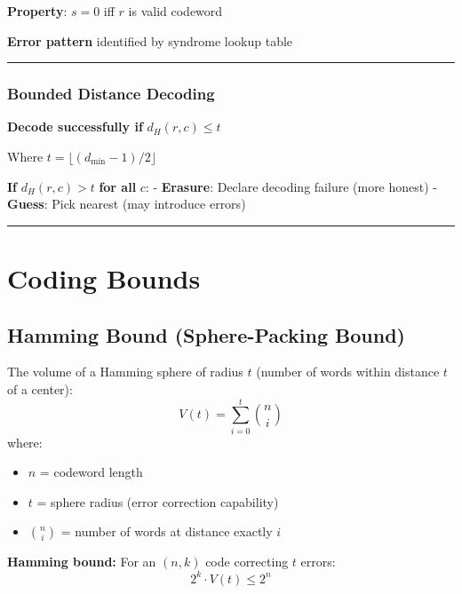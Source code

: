 \textbf{Property}: \(s = 0\) iff \(r\) is valid codeword

\textbf{Error pattern} identified by syndrome lookup table

\begin{center}\rule{0.5\linewidth}{0.5pt}\end{center}

\subsubsection{Bounded Distance
Decoding}\label{bounded-distance-decoding}

\textbf{Decode successfully if} \(d_H(r, c) \leq t\)

Where \(t = \lfloor (d_{\min} - 1)/2 \rfloor\)

\textbf{If} \(d_H(r, c) > t\) \textbf{for all} \(c\): -
\textbf{Erasure}: Declare decoding failure (more honest) -
\textbf{Guess}: Pick nearest (may introduce errors)

\begin{center}\rule{0.5\linewidth}{0.5pt}\end{center}

\section{Coding Bounds}

\subsection{Hamming Bound (Sphere-Packing Bound)}

The volume of a Hamming sphere of radius $t$ (number of words within distance $t$ of a center):
\begin{equation}
V(t) = \sum_{i=0}^{t} \binom{n}{i}
\label{eq:sphere-volume}
\end{equation}
where:
\begin{itemize}
\item $n$ = codeword length
\item $t$ = sphere radius (error correction capability)
\item $\binom{n}{i}$ = number of words at distance exactly $i$
\end{itemize}

\textbf{Hamming bound:} For an $(n, k)$ code correcting $t$ errors:
\begin{equation}
2^k \cdot V(t) \leq 2^n
\label{eq:hamming-bound}
\end{equation}

